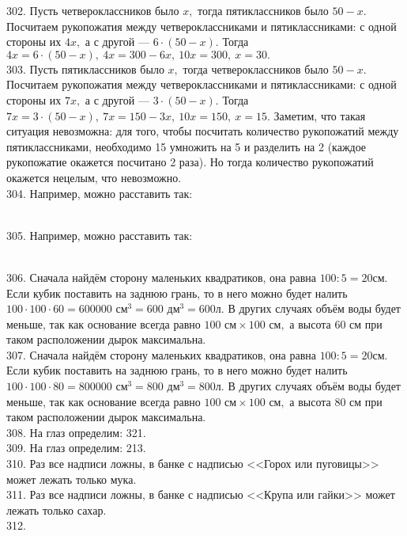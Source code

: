 302. Пусть четвероклассников было $x,$ тогда пятиклассников было  $50-x.$ Посчитаем рукопожатия между четвероклассниками и пятиклассниками: с одной стороны их $4x,$ а с другой --- $6\cdot(50-x).$ Тогда $4x=6\cdot(50-x),\
4x=300-6x,\ 10x=300,\ x=30.$\\
303. Пусть пятиклассников было $x,$ тогда четвероклассников было  $50-x.$ Посчитаем рукопожатия между четвероклассниками и пятиклассниками: с одной стороны их $7x,$ а с другой --- $3\cdot(50-x).$ Тогда $7x=3\cdot(50-x),\
7x=150-3x,\ 10x=150,\ x=15.$ Заметим, что такая ситуация невозможна: для того, чтобы посчитать количество рукопожатий между пятиклассниками, необходимо 15 умножить на 5 и разделить на 2 (каждое рукопожатие окажется посчитано 2 раза). Но тогда количество рукопожатий окажется нецелым, что невозможно.\\
304. Например, можно расставить так:
\begin{figure}[ht!]
\end{figure}\\
305. Например, можно расставить так:
\begin{figure}[ht!]
\end{figure}\\
306. Сначала найдём сторону маленьких квадратиков, она равна $100:5=20$см. Если кубик поставить на заднюю грань, то в него можно будет налить $100\cdot100\cdot60=600000\text{ см}^3=600\text{ дм}^3=600$л. В других случаях объём воды будет меньше, так как основание всегда равно $100\text{ см}\times100\text{ см},$ а высота 60 см при таком расположении дырок максимальна.\\
307. Сначала найдём сторону маленьких квадратиков, она равна $100:5=20$см. Если кубик поставить на заднюю грань, то в него можно будет налить $100\cdot100\cdot80=800000\text{ см}^3=800\text{ дм}^3=800$л. В других случаях объём воды будет меньше, так как основание всегда равно $100\text{ см}\times100\text{ см},$ а высота 80 см при таком расположении дырок максимальна.\\
308. На глаз определим: 321.\\
309. На глаз определим: 213.\\
310. Раз все надписи ложны, в банке с надписью <<Горох или пуговицы>> может лежать только мука.\\
311. Раз все надписи ложны, в банке с надписью <<Крупа или гайки>> может лежать только сахар.\\
312.\begin{figure}[ht!]
\center{\texttt{[image: otr1.png]}}
\end{figure}\\
